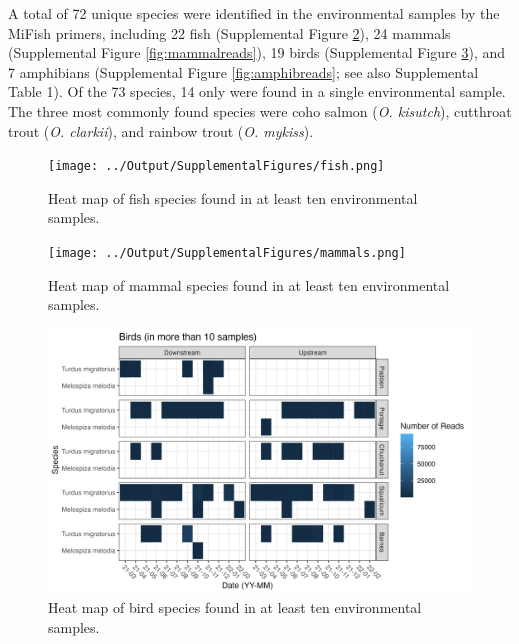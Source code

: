 \documentclass[
]{article}
\begin{document}
A total of 72 unique species were identified in the environmental
samples by the MiFish primers, including 22 fish (Supplemental Figure
\ref{fig:fishreads}), 24 mammals (Supplemental Figure
\ref{fig:mammalreads}), 19 birds (Supplemental Figure
\ref{fig:birdreads}), and 7 amphibians (Supplemental Figure
\ref{fig:amphibreads}; see also Supplemental Table 1). Of the 73
species, 14 only were found in a single environmental sample. The three
most commonly found species were coho salmon (\emph{O. kisutch}),
cutthroat trout (\emph{O. clarkii}), and rainbow trout (\emph{O.
mykiss}).

\begin{figure}
\centering
\texttt{[image: ../Output/SupplementalFigures/fish.png]}
\caption{Heat map of fish species found in at least ten environmental
samples.\label{fig:fishreads}}
\end{figure}

\begin{figure}
\centering
\texttt{[image: ../Output/SupplementalFigures/mammals.png]}
\caption{Heat map of mammal species found in at least ten environmental
samples.\label{fig:fishreads}}
\end{figure}

\begin{figure}
\centering
\includegraphics{../Output/SupplementalFigures/birds.png}
\caption{Heat map of bird species found in at least ten environmental
samples.\label{fig:birdreads}}
\end{figure}
\end{document}
